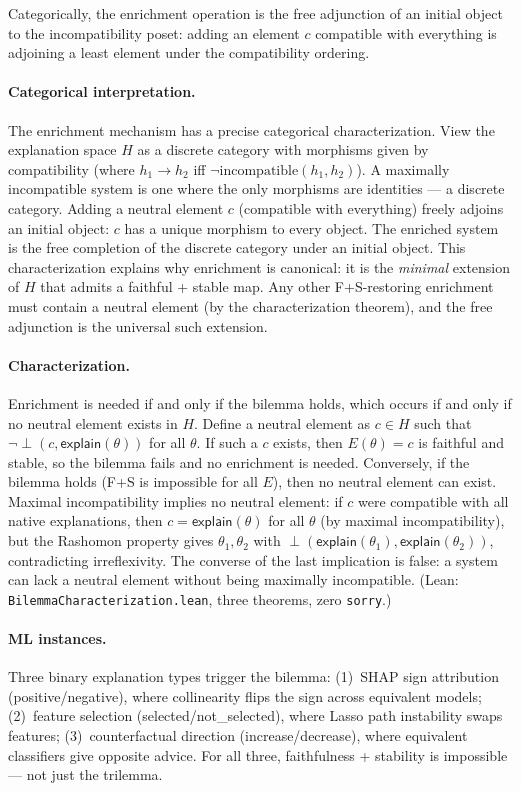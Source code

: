\documentclass[11pt,a4paper]{article}
\newcommand{\incomp}{\perp}
\begin{document}
Categorically, the enrichment operation is the free adjunction of an initial object to the incompatibility poset: adding an element $c$ compatible with everything is adjoining a least element under the compatibility ordering.

\paragraph{Categorical interpretation.} The enrichment mechanism has a precise categorical characterization. View the explanation space $H$ as a discrete category with morphisms given by compatibility (where $h_1 \to h_2$ iff $\lnot\mathrm{incompatible}(h_1, h_2)$). A maximally incompatible system is one where the only morphisms are identities --- a discrete category. Adding a neutral element $c$ (compatible with everything) freely adjoins an initial object: $c$ has a unique morphism to every object. The enriched system is the free completion of the discrete category under an initial object. This characterization explains why enrichment is canonical: it is the \emph{minimal} extension of $H$ that admits a faithful + stable map. Any other F+S-restoring enrichment must contain a neutral element (by the characterization theorem), and the free adjunction is the universal such extension.

\paragraph{Characterization.}
Enrichment is needed if and only if the bilemma holds, which occurs if and only if no neutral element exists in $H$.  Define a neutral element as $c \in H$ such that $\lnot\incomp(c, \mathsf{explain}(\theta))$ for all $\theta$.  If such a $c$ exists, then $E(\theta) = c$ is faithful and stable, so the bilemma fails and no enrichment is needed.  Conversely, if the bilemma holds (F+S is impossible for all $E$), then no neutral element can exist.  Maximal incompatibility implies no neutral element: if $c$ were compatible with all native explanations, then $c = \mathsf{explain}(\theta)$ for all $\theta$ (by maximal incompatibility), but the Rashomon property gives $\theta_1, \theta_2$ with $\incomp(\mathsf{explain}(\theta_1), \mathsf{explain}(\theta_2))$, contradicting irreflexivity.  The converse of the last implication is false: a system can lack a neutral element without being maximally incompatible.  (Lean: \texttt{BilemmaCharacterization.lean}, three theorems, zero \texttt{sorry}.)

\paragraph{ML instances.}
Three binary explanation types trigger the bilemma:
(1)~SHAP sign attribution (positive/negative), where collinearity flips the sign across equivalent models;
(2)~feature selection (selected/not\_selected), where Lasso path instability swaps features;
(3)~counterfactual direction (increase/decrease), where equivalent classifiers give opposite advice.
For all three, faithfulness + stability is impossible --- not just the trilemma.
\end{document}
